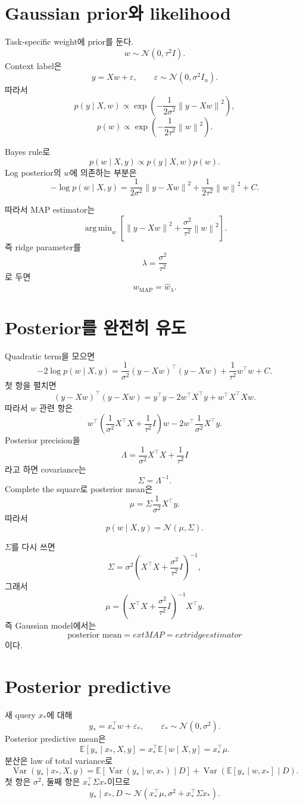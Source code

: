 \documentclass[11pt,a4paper,oneside,openany]{memoir}
\newcommand{\E}{\mathbb{E}}
\newcommand{\Var}{\operatorname{Var}}
\newcommand{\norm}[1]{\left\lVert #1\right\rVert}
\DeclareMathOperator*{\argmin}{arg\,min}
\theoremstyle{definition}
\begin{document}
\section{Gaussian prior와 likelihood}

Task-specific weight에 prior를 둔다.
\[
w\sim\mathcal N(0,\tau^2I).
\]
Context label은
\[
y=Xw+\varepsilon,
\qquad
\varepsilon\sim\mathcal N(0,\sigma^2I_n).
\]
따라서
\[
p(y\mid X,w)
\propto
\exp\left(
-\frac{1}{2\sigma^2}\norm{y-Xw}^2
\right),
\]
\[
p(w)
\propto
\exp\left(
-\frac{1}{2\tau^2}\norm w^2
\right).
\]

Bayes rule로
\[
p(w\mid X,y)
\propto p(y\mid X,w)p(w).
\]
Log posterior의 $w$에 의존하는 부분은
\[
-\log p(w\mid X,y)
=\frac{1}{2\sigma^2}\norm{y-Xw}^2
+\frac{1}{2\tau^2}\norm w^2+C.
\]

따라서 MAP estimator는
\[
\argmin_w
\left[
\norm{y-Xw}^2
+\frac{\sigma^2}{\tau^2}\norm w^2
\right].
\]
즉 ridge parameter를
\[
\lambda=\frac{\sigma^2}{\tau^2}
\]
로 두면
\[
\boxed{
w_{\mathrm{MAP}}=\hat w_\lambda}.
\]

\section{Posterior를 완전히 유도}

Quadratic term을 모으면
\[
-2\log p(w\mid X,y)
=
\frac1{\sigma^2}(y-Xw)^\top(y-Xw)
+\frac1{\tau^2}w^\top w+C.
\]
첫 항을 펼치면
\[
(y-Xw)^\top(y-Xw)
=y^\top y-2w^\top X^\top y+w^\top X^\top Xw.
\]
따라서 $w$ 관련 항은
\[
w^\top
\left(
\frac1{\sigma^2}X^\top X+\frac1{\tau^2}I
\right)w
-2w^\top\frac1{\sigma^2}X^\top y.
\]
Posterior precision을
\[
\Lambda
=\frac1{\sigma^2}X^\top X+\frac1{\tau^2}I
\]
라고 하면 covariance는
\[
\Sigma=\Lambda^{-1}.
\]
Complete the square로 posterior mean은
\[
\mu
=\Sigma\frac1{\sigma^2}X^\top y.
\]
따라서
\[
\boxed{
p(w\mid X,y)=\mathcal N(\mu,\Sigma)}.
\]

$\Sigma$를 다시 쓰면
\[
\Sigma
=\sigma^2
\left(X^\top X+\frac{\sigma^2}{\tau^2}I\right)^{-1},
\]
그래서
\[
\mu
=\left(X^\top X+\frac{\sigma^2}{\tau^2}I\right)^{-1}X^\top y.
\]
즉 Gaussian model에서는
\[
\boxed{
\text{posterior mean}=	ext{MAP}=	ext{ridge estimator}
}
\]
이다.

\section{Posterior predictive}

새 query $x_*$에 대해
\[
y_*=x_*^\top w+\varepsilon_*,
\qquad
\varepsilon_*\sim\mathcal N(0,\sigma^2).
\]
Posterior predictive mean은
\[
\E[y_*\mid x_*,X,y]
=x_*^\top\E[w\mid X,y]
=x_*^\top\mu.
\]
분산은 law of total variance로
\[
\Var(y_*\mid x_*,X,y)
=
\E[\Var(y_*\mid w,x_*)\mid D]
+
\Var(\E[y_*\mid w,x_*]\mid D).
\]
첫 항은 $\sigma^2$, 둘째 항은 $x_*^\top\Sigma x_*$이므로
\[
\boxed{
y_*\mid x_*,D
\sim
\mathcal N
\left(
x_*^\top\mu,
\sigma^2+x_*^\top\Sigma x_*
\right)}.
\]
\end{document}
